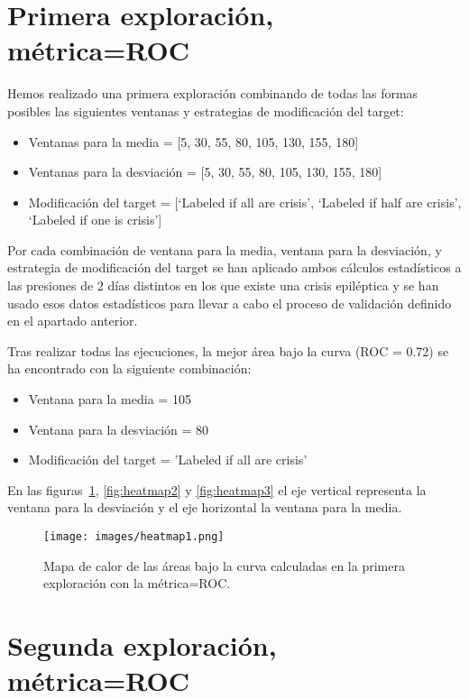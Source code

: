 \documentclass[a4paper,12pt,twoside,oldfontcommands]{memoir}
\begin{document}
\section{Primera exploración, métrica=ROC}

Hemos realizado una primera exploración combinando de todas las formas posibles las siguientes ventanas y estrategias de modificación del target: 
\begin{itemize}
    \item Ventanas para la media = [5, 30, 55, 80, 105, 130, 155, 180]
    \item Ventanas para la desviación = [5, 30, 55, 80, 105, 130, 155, 180]
    \item Modificación del target = [`Labeled if all are crisis', `Labeled if half are crisis', `Labeled if one is crisis']
\end{itemize}
 
Por cada combinación de ventana para la media, ventana para la desviación, y estrategia de modificación del target se han aplicado ambos cálculos estadísticos a las presiones de 2 días distintos en los que existe una crisis epiléptica y se han usado esos datos estadísticos para llevar a cabo el proceso de validación definido en el apartado anterior.

Tras realizar todas las ejecuciones, la mejor área bajo la curva (ROC = 0.72) se ha encontrado con la siguiente combinación: 
\begin{itemize}
    \item Ventana para la media = 105
    \item Ventana para la desviación = 80
    \item Modificación del target = 'Labeled if all are crisis'
\end{itemize}

En las figuras~\ref{fig:heatmap1}, \ref{fig:heatmap2} y \ref{fig:heatmap3} el eje vertical representa la ventana para la desviación y el eje horizontal la ventana para la media. 

\begin{figure}
    \centering
    \texttt{[image: images/heatmap1.png]}
    \caption{Mapa de calor de las áreas bajo la curva calculadas en la primera exploración con la métrica=ROC.}
    \label{fig:heatmap1}
\end{figure}

\section{Segunda exploración, métrica=ROC}
\end{document}
